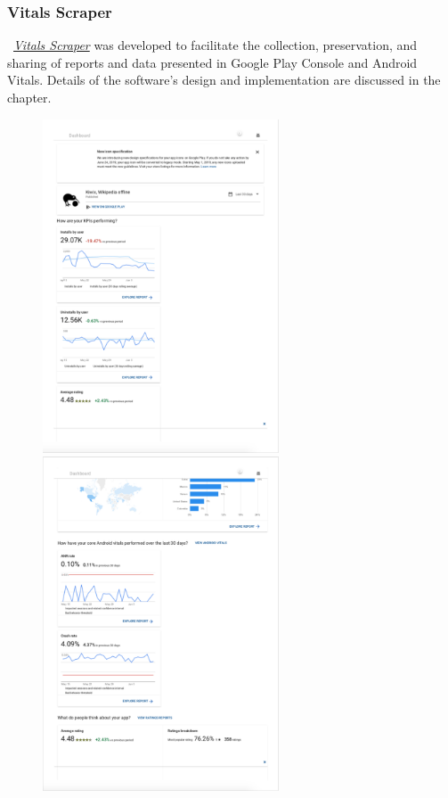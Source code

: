


\subsubsection{Vitals Scraper}
~\href{section-vitals-scraper}{\emph{Vitals Scraper}} was developed to facilitate the collection, preservation, and sharing of reports and data presented in Google Play Console and Android Vitals. Details of the software's design and implementation are discussed in the~\href{chapter-code-needed}{} chapter.

\begin{figure}
    \centering
    \includegraphics[width=7cm]{images/google-play-console/Dashboard - Kiwix-Google-Play-Console-(2019-Jun-14)-p1.png}
    \includegraphics[width=7cm]{images/google-play-console/Dashboard - Kiwix-Google-Play-Console-(2019-Jun-14)-p3.png}

\end{figure}
